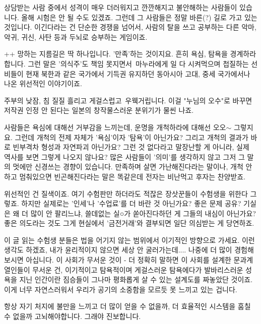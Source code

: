 상담받는 사람 중에서 성격이 매우 더러워지고 깐깐해지고 불안해하는 사람들이 있습니다.
올해 시험은 안 될 수도 있겠죠. 그런데 그 사람들은 정말 바른(?) 길로 가고 있는 것입니다.
이긴다라는 건 단순한 경쟁을 넘어서, 사람의 탈을 쓰고 공부하는 다른 악마, 악귀, 귀신, 사탄 등과 두뇌로 승부하는 게임이죠.
\vspace{5mm}

++ 망하는 지름길은 딱 하나입니다. '만족'하는 것이지요.
흔히 욕심, 탐욕을 경계하라 합니다.
그런 말은 '의식주'도 책임 못지면서 마누라에게 일 다 시켜먹으며 첩질하는 선비들이
현재 북한과 같은 국가에서 기득권 유지하던 동아시아 고대, 중세 국가에서나 나온 위선적인 이야기이죠.
\vspace{5mm}

주부의 낮잠, 침 질질 흘리고 게걸스럽고 우웩거립니다.
이걸 "누님의 오수"로 바꾸면 저작권 인정 안 된다는 일본의 창작물스러운 분위기가 물씬 나죠.
\vspace{5mm}

사람들은 욕심에 대해선 거부감을 느끼는데, 운명을 개척하라에 대해선 오오$\sim$ 그렇지요.
그런데 개척의 전제 자체가 '욕심'이자 '탐욕'이 아닌가요? 그리고 개척의 결과가 바로 빈부격차 형성과 자연파괴 아닌가요?
그런 것 없다라고 말장난할 게 아니라, 실제 역사를 보면 그렇게 나오지 않나요?
많은 사람들이 '의미'를 생각하지 않고 그저 그 말의 멋에만 신경쓰는 경향이 있습니다.
만족하며 살면 가난해진다라는 말이나, 개척 안 하고 멈춰있으면 빈곤해진다라는 말은 똑같은데 전자는 비난먹고 후자는 찬양받죠.
\vspace{5mm}

위선적인 건 질색이죠. 여기 수험판만 하더라도 적잖은 장삿꾼들이 수험생을 위한다 그렇죠.
하지만 실제로는 '인세'나 '수업료'를 더 바란 것 아닌가요?
좋은 문제 공유? 기실은 왜 더 많이 안 팔리느냐, 쓸데없는 실○가 쏟아진다하던 게 그들의 내심이 아닌가요?
좋은 의도라는 것도 그게 현실에서 '금전거래'와 결부되면 일단 의심받는 게 당연하죠.
\vspace{5mm}

이 글 읽는 수험생 분들은 법을 어기지 않는 범위에서 이기적인 방향으로 가세요.
이런 생각도 하겠죠, 내가 윤리적이지 않으면 세상 안 굴러가는데.... 나중에 더 많이 경험해보시면 아십니다.
이 사회가 무서운 것이 - 더 정확히 말하면 이 사회를 설계한 문과계열인들이 무서운 건,
이기적이고 탐욕적이며 게걸스러운 탐욕에다가 발바리스러운 성욕을 지닌 인간이란 짐승들이
그나마 평화롭게 살 수 있는 설계도를 짜놓았단 것이죠. 이게 너무 자연스러워서 우리가 공기의 소중함을 모르듯 못 느끼고 있는 겁니다.
\vspace{5mm}

항상 자기 처지에 불만을 느끼고 더 많이 얻을 수 없을까, 더 효율적인 시스템을 훔칠 수 없을까 고뇌해야합니다.
그래야 진보합니다.
\vspace{5mm}






